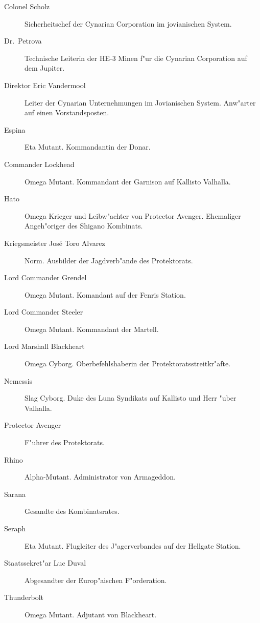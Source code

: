 
\begin{description}
\item [Colonel Scholz] Sicherheitschef der Cynarian Corporation im jovianischen System.
\item [Dr.~Petrova] Technische Leiterin der HE-3 Minen f"ur die Cynarian Corporation auf dem Jupiter.
\item [Direktor Eric Vandermool] Leiter der Cynarian Unternehmungen im Jovianischen System. Anw"arter auf einen
      Vorstandsposten.
\item [Espina] Eta Mutant. Kommandantin der Donar.
\item [Commander Lockhead] Omega Mutant. Kommandant der Garnison auf Kallisto Valhalla.
\item [Hato] Omega Krieger und Leibw"achter von Protector Avenger. Ehemaliger Angeh"origer des Shigano Kombinats.
\item [Kriegsmeister Jos\'{e} \frqq{}Toro\flqq{} Alvarez] Norm. Ausbilder der Jagdverb"ande des Protektorats.
\item [Lord Commander Grendel] Omega Mutant. Komandant auf der Fenris Station.
\item [Lord Commander Steeler] Omega Mutant. Kommandant der Martell.
\item [Lord Marshall Blackheart] Omega Cyborg. Oberbefehlshaberin der Protektoratsstreitkr"afte.
\item [Nemessis] Slag Cyborg. Duke des Luna Syndikats auf Kallisto und Herr "uber Valhalla.
\item [Protector Avenger] F"uhrer des Protektorats.
\item [Rhino] Alpha-Mutant. Administrator von Armageddon.
\item [Sarana] Gesandte des Kombinatsrates.
\item [Seraph] Eta Mutant. Flugleiter des J"agerverbandes auf der Hellgate Station.
\item [Staatssekret"ar Luc Duval] Abgesandter der Europ"aischen F"orderation.
\item [Thunderbolt] Omega Mutant. Adjutant von Blackheart.
\end{description}
